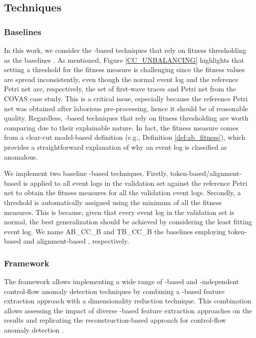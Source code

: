 \subsection{Techniques}
\subsubsection{Baselines}
In this work, we consider the -based techniques that rely on fitness thresholding as the baselines \cite{bezerra2009pmad, bezerra2013adlogspais, myers2018icsadpm, pecchia2020applicationfailuresanalysispm}. As mentioned, Figure \ref{CC_UNBALANCING} highlights that setting a threshold for the fitness measure is challenging since the fitness values are spread inconsistently, even though the normal event log and the reference Petri net are, respectively, the set of first-wave traces and Petri net from the COVAS case study. This is a critical issue, especially because the reference Petri net was obtained after laborious pre-processing, hence it should be of reasonable quality. Regardless, -based techniques that rely on fitness thresholding are worth comparing due to their explainable nature. In fact, the fitness measure comes from a clear-cut model-based definition (e.g., Definition \ref{def:ab_fitness}), which provides a straightforward explanation of why an event log is classified as anomalous.

We implement two baseline -based techniques. Firstly, token-based/alignment-based  is applied to all event logs in the validation set against the reference Petri net to obtain the fitness measures for all the validation event logs. Secondly, a threshold is automatically assigned using the minimum of all the fitness measures. This is because, given that every event log in the validation set is normal, the best generalization should be achieved by considering the least fitting event log. We name AB\_CC\_B and TB\_CC\_B the baselines employing token-based and alignment-based , respectively.

\subsubsection{Framework}
The framework allows implementing a wide range of -based and -independent control-flow anomaly detection techniques by combining a -based feature extraction approach with a dimensionality reduction technique. This combination allows assessing the impact of diverse -based feature extraction approaches on the results \cite{ko2023adsystematicreview, tavares2023pmtraceencoding} and replicating the reconstruction-based approach for control-flow anomaly detection \cite{nolle2018processadautoencoders, vijayakamal2020bpaead, elaziz2023drlbpad, chinnaiah2024deepaead, kan2024aebasedelad}.


